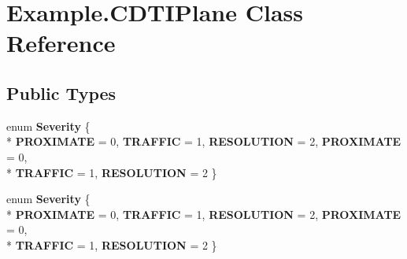 \hypertarget{class_example_1_1_c_d_t_i_plane}{}\section{Example.\+C\+D\+T\+I\+Plane Class Reference}
\label{class_example_1_1_c_d_t_i_plane}


 


\subsection*{Public Types}
\begin{DoxyCompactItemize}
\item 
\hypertarget{class_example_1_1_c_d_t_i_plane_af140920ed953b8579db5c8021fa03f92}{}enum {\bfseries Severity} \{ \\*
{\bfseries P\+R\+O\+X\+I\+M\+A\+T\+E} = 0, 
{\bfseries T\+R\+A\+F\+F\+I\+C} = 1, 
{\bfseries R\+E\+S\+O\+L\+U\+T\+I\+O\+N} = 2, 
{\bfseries P\+R\+O\+X\+I\+M\+A\+T\+E} = 0, 
\\*
{\bfseries T\+R\+A\+F\+F\+I\+C} = 1, 
{\bfseries R\+E\+S\+O\+L\+U\+T\+I\+O\+N} = 2
 \}\label{class_example_1_1_c_d_t_i_plane_af140920ed953b8579db5c8021fa03f92}

\item 
\hypertarget{class_example_1_1_c_d_t_i_plane_af140920ed953b8579db5c8021fa03f92}{}enum {\bfseries Severity} \{ \\*
{\bfseries P\+R\+O\+X\+I\+M\+A\+T\+E} = 0, 
{\bfseries T\+R\+A\+F\+F\+I\+C} = 1, 
{\bfseries R\+E\+S\+O\+L\+U\+T\+I\+O\+N} = 2, 
{\bfseries P\+R\+O\+X\+I\+M\+A\+T\+E} = 0, 
\\*
{\bfseries T\+R\+A\+F\+F\+I\+C} = 1, 
{\bfseries R\+E\+S\+O\+L\+U\+T\+I\+O\+N} = 2
 \}\label{class_example_1_1_c_d_t_i_plane_af140920ed953b8579db5c8021fa03f92}

\end{DoxyCompactItemize}
